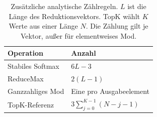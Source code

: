 \begin{table}[t]
\centering
\small
\caption{Zusätzliche analytische Zählregeln. $L$ ist die Länge des Reduktionsvektors. TopK wählt $K$ Werte aus einer Länge $N$. Die Zählung gilt je Vektor, außer für elementweises Mod.}
\label{tab:weighted-operations}
\begin{tabular}{@{}ll@{}}
\toprule
Operation & Anzahl \\
\midrule
Stabiles Softmax & $6L-3$ \\
ReduceMax & $2(L-1)$ \\
Ganzzahliges Mod & Eine pro Ausgabeelement \\
TopK-Referenz & $3\sum_{j=0}^{K-1}(N-j-1)$ \\
\bottomrule
\end{tabular}
\end{table}

